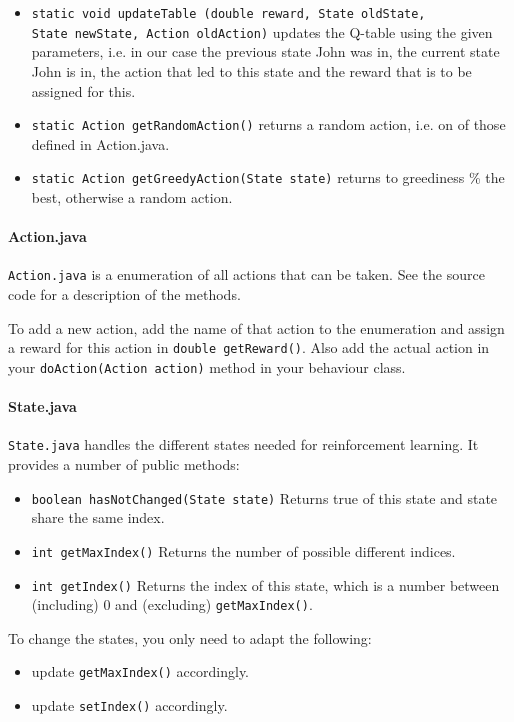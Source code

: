 \documentclass[a4paper,10pt]{scrartcl}
\begin{document}
\begin{itemize}
 \item \verb|static void updateTable (double reward, State oldState,|\\
  \verb|State newState, Action oldAction)| updates the Q-table using the given parameters, i.e. in our case the previous state John was in, the current state John is in, the action that led to this state and the reward that is to be assigned for this.
 \item \verb|static Action getRandomAction()| returns a random action, i.e. on of those defined in Action.java.
 \item \verb|static Action getGreedyAction(State state)| returns to  greediness \% the best, otherwise a random action.
\end{itemize}

\paragraph{Action.java}
\verb|Action.java| is a enumeration of all actions that can be taken. See the source code for a description of the methods.

To add a new action, add the name of that action to the enumeration and assign a reward for this action in \verb|double getReward()|. Also add the actual action in your \verb|doAction(Action action)| method in your behaviour class.

\paragraph{State.java}
\verb|State.java| handles the different states needed for reinforcement learning. It provides a number of public methods:
\begin{itemize}
 \item \verb|boolean hasNotChanged(State state)| Returns true of this state and state share the same index.
 \item \verb|int getMaxIndex()| Returns the number of possible different indices.
 \item \verb|int getIndex()| Returns the index of this state, which is a number between (including) 0 and (excluding) \verb|getMaxIndex()|.
\end{itemize} 

To change the states, you only need to adapt the following:
\begin{itemize}
 \item update \verb|getMaxIndex()| accordingly.
 \item update \verb|setIndex()| accordingly.
\end{itemize}
\end{document}
